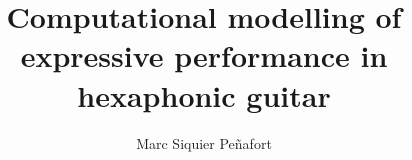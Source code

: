 




\title{Computational modelling of expressive performance in hexaphonic guitar}
\author{Marc Siquier Peñafort}

\maketitle
\maketitle
\restoregeometry
\sloppy





\preface
\body














